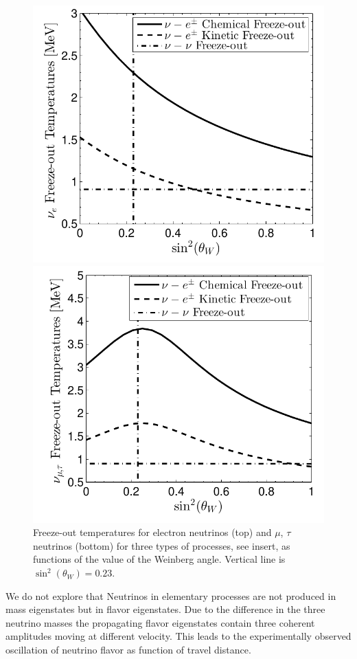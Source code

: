 \begin{figure}
\centerline{\includegraphics[width=0.82\linewidth]{04-birrell/ParametricStudies/Figures/nu_e_freezeout.pdf}}
\centerline{\includegraphics[width=0.82\linewidth]{04-birrell/ParametricStudies/Figures/nu_mu_freezeout.pdf}}
\caption{Freeze-out temperatures for electron neutrinos (top) and $\mu$, $\tau$ neutrinos (bottom) for three types of processes, see insert, as functions of the value of the Weinberg angle. Vertical line is $\sin^2(\theta_W)=0.23$. }
\label{fig:freezeoutT_B}
 \end{figure}

We do not explore that Neutrinos in  elementary processes are not produced in mass eigenstates but in flavor eigenstates. Due to the difference in the three neutrino masses the  propagating flavor eigenstates contain three coherent amplitudes moving at different velocity. This leads to the experimentally observed oscillation of neutrino flavor as function of travel distance.

